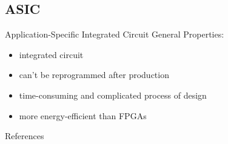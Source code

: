 \documentclass[en]{sdqbeamer}
\begin{document}

\subsection{ASIC}
\begin{frame}{Application-Specific Integrated Circuit}
	General Properties:
	\begin{itemize}
		\item integrated circuit
		\item can't be reprogrammed after production
		\item time-consuming and complicated process of design
		\item more energy-efficient than FPGAs
	\end{itemize}
\end{frame}

\begin{frame}
	
\end{frame}

\appendix
\beginbackup

\begin{frame}{References}
	\printbibliography
\end{frame}
\end{document}
